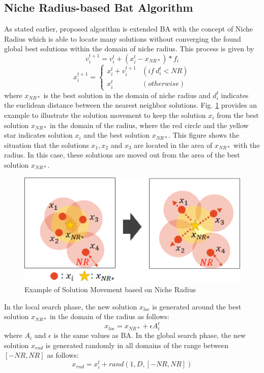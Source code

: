 \documentclass[conference]{IEEEtran}
\begin{document}
\subsection{Niche Radius-based Bat Algorithm}
As stated earlier, proposed algorithm is extended BA with the concept of Niche Radius which is able to locate many solutions without converging the found global best solutions within the domain of niche radius. This process is given by
\begin{equation}
\label{eq:nrvi}
v_i^{t+1}=v_i^t+(x_i^t-x_{NR*})*f_i
\end{equation}
\begin{equation}
\label{eq:nrxi}
x_i^{t+1}= \begin{cases}
x_i^t+v_i^{t+1} & (if \ d_i^t < NR) \\
x_i^t & (otherwise)
\end{cases}
\end{equation}
where $x_{NR*}$ is the best solution in the domain of niche radius and $d_i^t$ indicates the euclidean distance between the nearest neighbor solutions. Fig. \ref{fig:niche} provides an example to illustrate the solution movement to keep the solution $x_i$ from the best solution $x_{NR*}$ in the domain of the radius, where the red circle and the yellow star indicates solution $x_i$ and the best solution $x_{NR*}$. This figure shows the situation that the solutions $x_1, x_2 $ and $ x_3$ are located in the area of $x_{NR*}$ with the radius. In this case, these solutions are moved out from the area of the best solution $x_{NR*}$.

\begin{figure}[h]
\begin{center}
\includegraphics[width=0.8\linewidth]{eps/niche.eps}
\end{center}
\caption{Example of Solution Movement based on Niche Radius}
\label{fig:niche}
\end{figure}

In the local search phase, the new solution $x_{loc}$ is generated around the best solution $x_{NR*}$ in the domain of the radius as follows:
\begin{equation}
\label{eq:nrloc}
x_{loc}=x_{NR*} + \epsilon A_i^t
\end{equation}
where $A_i$ and $\epsilon$ is the same values as BA.
In the global search phase, the new solution $x_{rnd}$ is generated randomly in all domains of the range between $[-NR, NR]$ as follows: 
\begin{equation}
\label{eq:nrrnd}
x_{rnd}=x_i^t + rand(1,D,[-NR, NR])
\end{equation}
\end{document}
